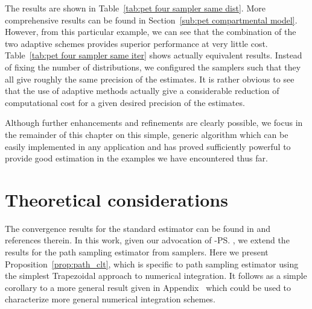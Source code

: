 

The results are shown in Table~\ref{tab:pet four sampler same dist}. More comprehensive results can be found in Section~\ref{sub:pet compartmental model}. However, from this particular example, we can see that the combination of the two adaptive schemes provides superior performance at very little  cost. Table~\ref{tab:pet four sampler same iter} shows actually equivalent results. Instead of fixing the number of distributions, we configured the samplers such that they all give roughly the same precision of the estimates. It is rather obvious to see that the use of adaptive methods actually give a considerable reduction of computational cost for a given desired precision of the estimates.



Although further enhancements and refinements are clearly possible, we focus in the remainder of this chapter on this simple, generic algorithm which can be easily implemented in any application and has proved sufficiently powerful to provide good estimation in the examples we have encountered thus far.

\section{Theoretical considerations}
\label{sec:Theoretical considerations}

The convergence results for the standard estimator can be found in \cite{DelMoral:2006hc} and references therein. In this work, given our advocation of \smc[2]-\ps, we extend the results for the path sampling estimator from \smc samplers. Here we present Proposition~\ref{prop:path_clt}, which is specific to path sampling estimator using the simplest Trapezoidal approach to numerical integration. It follows as a simple corollary to a more general result given in Appendix~ which could be used to characterize more general numerical integration schemes.

